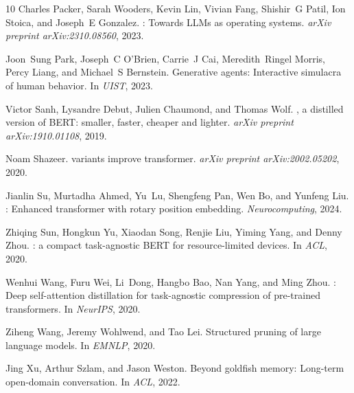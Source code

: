 \documentclass[11pt,a4paper]{article}
\begin{document}
\begin{thebibliography}{10}
Charles Packer, Sarah Wooders, Kevin Lin, Vivian Fang, Shishir~G Patil,
  Ion Stoica, and Joseph~E Gonzalez.
: Towards {LLMs} as operating systems.
\newblock \emph{arXiv preprint arXiv:2310.08560}, 2023.

Joon~Sung Park, Joseph~C O'Brien, Carrie~J Cai, Meredith~Ringel Morris, Percy
  Liang, and Michael~S Bernstein.
\newblock Generative agents: Interactive simulacra of human behavior.
\newblock In \emph{UIST}, 2023.

Victor Sanh, Lysandre Debut, Julien Chaumond, and Thomas Wolf.
, a distilled version of {BERT}: smaller, faster, cheaper
  and lighter.
\newblock \emph{arXiv preprint arXiv:1910.01108}, 2019.

Noam Shazeer.
 variants improve transformer.
\newblock \emph{arXiv preprint arXiv:2002.05202}, 2020.

Jianlin Su, Murtadha Ahmed, Yu~Lu, Shengfeng Pan, Wen Bo, and Yunfeng Liu.
: Enhanced transformer with rotary position embedding.
\newblock \emph{Neurocomputing}, 2024.

Zhiqing Sun, Hongkun Yu, Xiaodan Song, Renjie Liu, Yiming Yang, and Denny Zhou.
: a compact task-agnostic {BERT} for resource-limited
  devices.
\newblock In \emph{ACL}, 2020.

Wenhui Wang, Furu Wei, Li~Dong, Hangbo Bao, Nan Yang, and Ming Zhou.
: Deep self-attention distillation for task-agnostic
  compression of pre-trained transformers.
\newblock In \emph{NeurIPS}, 2020.

Ziheng Wang, Jeremy Wohlwend, and Tao Lei.
\newblock Structured pruning of large language models.
\newblock In \emph{EMNLP}, 2020.

Jing Xu, Arthur Szlam, and Jason Weston.
\newblock Beyond goldfish memory: Long-term open-domain conversation.
\newblock In \emph{ACL}, 2022.

\end{thebibliography}
\end{document}
